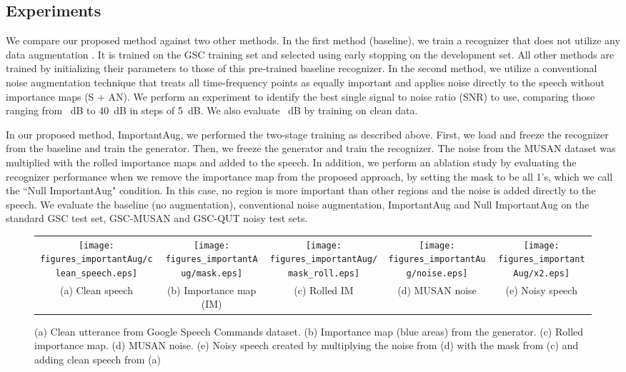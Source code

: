 \documentclass{article}
\begin{document}
\subsection{Experiments}

We compare our proposed method against two other methods. In the first method (baseline), we train a recognizer that does not utilize any data augmentation . It is trained on the GSC training set and selected using early stopping on the development set. All other methods are trained by initializing their parameters to those of this pre-trained baseline recognizer. 
In the second method, we utilize a conventional noise augmentation technique that treats all time-frequency points as equally important and applies noise directly to the speech without importance maps (S + AN). We perform an experiment to identify the best single signal to noise ratio (SNR) to use, comparing those ranging from ~dB to 40~dB in steps of 5~dB. We also evaluate ~dB by training on clean data. 

In our proposed method, ImportantAug, we performed the two-stage training as described above. First, we load and freeze the recognizer from the baseline and train the generator. Then, we freeze the generator and train the recognizer. The noise from the MUSAN dataset was multiplied with the rolled importance maps and added to the speech. In addition, we perform an ablation study by evaluating the recognizer performance when we remove the importance map from the proposed approach, by setting the mask to be all 1's, which we call the ``Null ImportantAug" condition. In this case, no region is more important than other regions and the noise is added directly to the speech. 
We evaluate the baseline (no augmentation), conventional noise augmentation, ImportantAug and Null ImportantAug on the standard GSC test set, GSC-MUSAN and GSC-QUT noisy test sets. 

\begin{figure*}
  \begin{center}
    \scriptsize
    \begin{tabular}{ccccc}
      \texttt{[image: figures\_importantAug/clean\_speech.eps]} &
      \texttt{[image: figures\_importantAug/mask.eps]} &
      \texttt{[image: figures\_importantAug/mask\_roll.eps]} &
      \texttt{[image: figures\_importantAug/noise.eps]} &
      \texttt{[image: figures\_importantAug/x2.eps]} \\
      (a) Clean speech &
      (b) Importance map (IM) &
      (c) Rolled IM &
      (d) MUSAN noise &
      (e) Noisy speech \\
    \end{tabular}
  \end{center}
  \caption{
  (a) Clean utterance from Google Speech Commands dataset. (b) Importance map (blue areas) from the generator. (c) Rolled importance map. (d) MUSAN noise. (e) Noisy speech created by multiplying the noise from (d) with the mask from (c) and adding clean speech from (a) }
  \label{fig:Important_aug_process}
\end{figure*}
\end{document}
